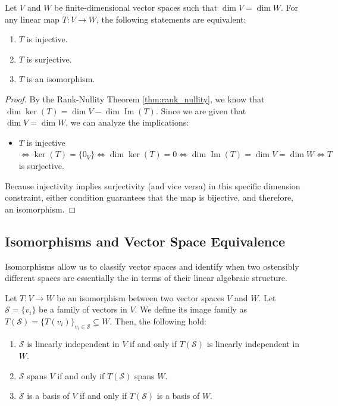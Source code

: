 \begin{corollary}
\label{cor:equal_dim_iso}
Let $V$ and $W$ be finite-dimensional vector spaces such that $\dim V = \dim W$. For any linear map $T: V \to W$, the following statements are equivalent:
\begin{enumerate}
    \item $T$ is injective.
    \item $T$ is surjective.
    \item $T$ is an isomorphism.
\end{enumerate}
\end{corollary}

\begin{proof}
By the Rank-Nullity Theorem \eqref{thm:rank_nullity}, we know that $\dim \ker(T) = \dim V - \dim \operatorname{Im}(T)$. Since we are given that $\dim V = \dim W$, we can analyze the implications:
\begin{itemize}
    \item $T$ is injective $\iff \ker(T) = \{0_V\} \iff \dim \ker(T) = 0 \iff \dim \operatorname{Im}(T) = \dim V = \dim W \iff T$ is surjective.
\end{itemize}
Because injectivity implies surjectivity (and vice versa) in this specific dimension constraint, either condition guarantees that the map is bijective, and therefore, an isomorphism.
\end{proof}

\subsection{Isomorphisms and Vector Space Equivalence}

Isomorphisms allow us to classify vector spaces and identify when two ostensibly different spaces are essentially the  in terms of their linear algebraic structure.

\setcounter{theorem}{11} %

\begin{theorem}
\label{thm:iso_preserves_bases}
Let $T: V \to W$ be an isomorphism between two vector spaces $V$ and $W$. Let $\mathcal{S} = \{v_i\}$ be a family of vectors in $V$. We define its image family as $T(\mathcal{S}) = \{T(v_i)\}_{v_i \in \mathcal{S}} \subseteq W$. Then, the following hold:
\begin{enumerate}
    \item $\mathcal{S}$ is linearly independent in $V$ if and only if $T(\mathcal{S})$ is linearly independent in $W$.
    \item $\mathcal{S}$ spans $V$ if and only if $T(\mathcal{S})$ spans $W$.
    \item $\mathcal{S}$ is a basis of $V$ if and only if $T(\mathcal{S})$ is a basis of $W$.
\end{enumerate}
\end{theorem}

